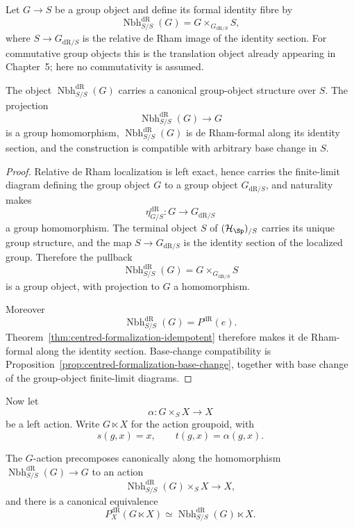Let $G\to S$ be a group object and define its formal identity fibre by
\[
    \operatorname{Nbh}^{\mathrm{dR}}_{S/S}(G)
    =
    G\times_{G_{\mathrm{dR}/S}}S,
\]
where $S\to G_{\mathrm{dR}/S}$ is the relative de Rham image of the identity
section.  For commutative group objects this is the translation object already
appearing in Chapter~5; here no commutativity is assumed.

\begin{proposition}
\label{prop:formal-identity-group}
The object $\operatorname{Nbh}^{\mathrm{dR}}_{S/S}(G)$ carries a canonical group-object
structure over $S$.  The projection
\[
    \operatorname{Nbh}^{\mathrm{dR}}_{S/S}(G)\longrightarrow G
\]
is a group homomorphism, $\operatorname{Nbh}^{\mathrm{dR}}_{S/S}(G)$ is de Rham-formal along its
identity section, and the construction is compatible with arbitrary base
change in $S$.
\end{proposition}

\begin{proof}
Relative de Rham localization is left exact, hence carries the finite-limit
diagram defining the group object $G$ to a group object
$G_{\mathrm{dR}/S}$, and naturality makes
\[
    \eta_{G/S}^{\mathrm{dR}}:G\longrightarrow G_{\mathrm{dR}/S}
\]
a group homomorphism.  The terminal object $S$ of $(\mathcal H_{\Sp})_{/S}$ carries
its unique group structure, and the map
$S\to G_{\mathrm{dR}/S}$ is the identity section of the localized group.
Therefore the pullback
\[
    \operatorname{Nbh}^{\mathrm{dR}}_{S/S}(G)
    =
    G\times_{G_{\mathrm{dR}/S}}S
\]
is a group object, with projection to $G$ a homomorphism.

Moreover
\[
    \operatorname{Nbh}^{\mathrm{dR}}_{S/S}(G)
    =
    P^{\mathrm{dR}}(e).
\]
Theorem~\ref{thm:centred-formalization-idempotent} therefore makes it de Rham-formal
along the identity section.  Base-change compatibility is
Proposition~\ref{prop:centred-formalization-base-change}, together with
base change of the group-object finite-limit diagrams.
\end{proof}

Now let
\[
    \alpha:G\times_SX\longrightarrow X
\]
be a left action.  Write $G\ltimes X$ for the action groupoid, with
\[
    s(g,x)=x,
    \qquad
    t(g,x)=\alpha(g,x).
\]

\begin{theorem}
\label{thm:action-groupoid-formalization}
The $G$-action precomposes canonically along the homomorphism
$\operatorname{Nbh}^{\mathrm{dR}}_{S/S}(G)\to G$ to an action
\[
    \operatorname{Nbh}^{\mathrm{dR}}_{S/S}(G)\times_SX
    \longrightarrow X,
\]
and there is a canonical equivalence
\[
    P_X^{\mathrm{dR}}(G\ltimes X)
    \simeq
    \operatorname{Nbh}^{\mathrm{dR}}_{S/S}(G)\ltimes X.
\]
\end{theorem}

